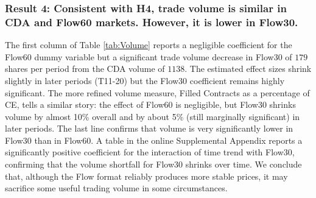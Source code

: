 \documentclass[12pt]{article}
\begin{document}
\subsubsection*{Result 4: Consistent with H4, trade volume is similar in CDA and Flow60 markets. However, it is lower in Flow30.}

The first column of Table \ref{tab:Volume} reports a negligible coefficient for the Flow60 dummy variable but a significant trade volume decrease in Flow30 of $179$ shares per period from the CDA volume of $1138$. The estimated effect sizes shrink slightly in later periods (T11-20) 
but the Flow30 coefficient remains highly significant. 
The more refined volume measure, Filled Contracts as a percentage of CE, tells a similar story: the effect of Flow60 is negligible, but Flow30 shrinks volume by almost 10\% overall and by about 5\% (still marginally significant) in later periods. 
The last line confirms that volume is very significantly lower in Flow30 than in Flow60.
A table in the online Supplemental Appendix reports a significantly positive coefficient for the interaction of time trend with Flow30,
confirming that the volume shortfall for Flow30 shrinks over time.
We conclude that, although the Flow format reliably produces more stable prices, it may sacrifice some useful trading volume in some circumstances. 

\end{document}
